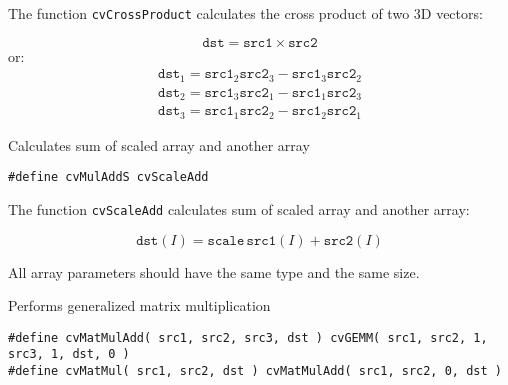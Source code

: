 
\begin{description}
\end{description}


The function \texttt{cvCrossProduct} calculates the cross product of two 3D vectors:

\[ \texttt{dst} = \texttt{src1} \times \texttt{src2} \]
or:
\[
\begin{array}{l}
\texttt{dst}_1 = \texttt{src1}_2 \texttt{src2}_3 - \texttt{src1}_3 \texttt{src2}_2\\
\texttt{dst}_2 = \texttt{src1}_3 \texttt{src2}_1 - \texttt{src1}_1 \texttt{src2}_3\\
\texttt{dst}_3 = \texttt{src1}_1 \texttt{src2}_2 - \texttt{src1}_2 \texttt{src2}_1
\end{array}
\]


Calculates sum of scaled array and another array

\begin{lstlisting}
#define cvMulAddS cvScaleAdd
\end{lstlisting}

\begin{description}
\end{description}

The function \texttt{cvScaleAdd} calculates sum of scaled array and another array:

\[
\texttt{dst}(I)=\texttt{scale} \, \texttt{src1}(I) + \texttt{src2}(I)
\]

All array parameters should have the same type and the same size.


Performs generalized matrix multiplication

\begin{lstlisting}
#define cvMatMulAdd( src1, src2, src3, dst ) cvGEMM( src1, src2, 1, src3, 1, dst, 0 )
#define cvMatMul( src1, src2, dst ) cvMatMulAdd( src1, src2, 0, dst )
\end{lstlisting}

